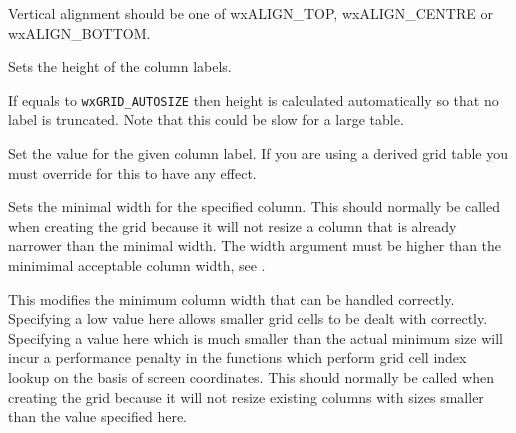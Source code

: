Vertical alignment should be one of wxALIGN\_TOP, wxALIGN\_CENTRE or wxALIGN\_BOTTOM.



\label{wxgridsetcollabelsize}


Sets the height of the column labels.

If  equals to \texttt{wxGRID\_AUTOSIZE} then height is calculated automatically
so that no label is truncated. Note that this could be slow for a large table.



\label{wxgridsetcollabelvalue}


Set the value for the given column label. If you are using a derived grid table you must
override 
for this to have any effect.



\label{wxgridsetcolminimalwidth}


Sets the minimal width for the specified column. This should normally be called when creating the grid
because it will not resize a column that is already narrower than the minimal width.
The width argument must be higher than the minimimal acceptable column width, see
.



\label{wxgridsetcolminimalacceptablewidth}


This modifies the minimum column width that can be handled correctly. Specifying a low value here
allows smaller grid cells to be dealt with correctly. Specifying a value here which is much smaller
than the actual minimum size will incur a performance penalty in the functions which perform
grid cell index lookup on the basis of screen coordinates.
This should normally be called when creating the grid because it will not resize existing columns
with sizes smaller than the value specified here.



